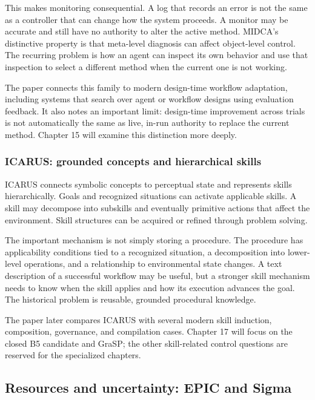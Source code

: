 This makes monitoring consequential. A log that records an error is not the same as a controller that can change how the system proceeds. A monitor may be accurate and still have no authority to alter the active method. MIDCA's distinctive property is that meta-level diagnosis can affect object-level control. The recurring problem is how an agent can inspect its own behavior and use that inspection to select a different method when the current one is not working.

The paper connects this family to modern design-time workflow adaptation, including systems that search over agent or workflow designs using evaluation feedback. It also notes an important limit: design-time improvement across trials is not automatically the same as live, in-run authority to replace the current method. Chapter 15 will examine this distinction more deeply.

\subsubsection{ICARUS: grounded concepts and hierarchical skills}

ICARUS connects symbolic concepts to perceptual state and represents skills hierarchically. Goals and recognized situations can activate applicable skills. A skill may decompose into subskills and eventually primitive actions that affect the environment. Skill structures can be acquired or refined through problem solving.

The important mechanism is not simply storing a procedure. The procedure has applicability conditions tied to a recognized situation, a decomposition into lower-level operations, and a relationship to environmental state changes. A text description of a successful workflow may be useful, but a stronger skill mechanism needs to know when the skill applies and how its execution advances the goal. The historical problem is reusable, grounded procedural knowledge.

The paper later compares ICARUS with several modern skill induction, composition, governance, and compilation cases. Chapter 17 will focus on the closed B5 candidate and GraSP; the other skill-related control questions are reserved for the specialized chapters.

\subsection{Resources and uncertainty: EPIC and Sigma}
\label{sec:ch11-epic-sigma}

